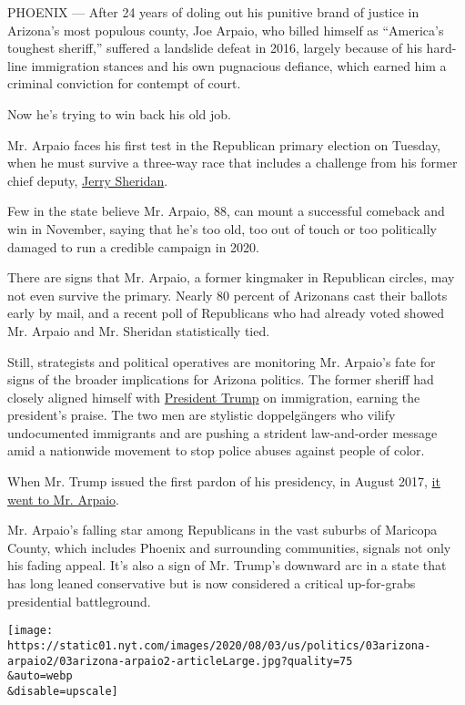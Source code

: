 PHOENIX --- After 24 years of doling out his punitive brand of justice
in Arizona's most populous county, Joe Arpaio, who billed himself as
``America's toughest sheriff,'' suffered a landslide defeat in 2016,
largely because of his hard-line immigration stances and his own
pugnacious defiance, which earned him a criminal conviction for contempt
of court.

Now he's trying to win back his old job.

Mr. Arpaio faces his first test in the Republican primary election on
Tuesday, when he must survive a three-way race that includes a challenge
from his former chief deputy,
\href{https://sheridan4sheriff2020.com/qualifications/}{Jerry Sheridan}.

Few in the state believe Mr. Arpaio, 88, can mount a successful comeback
and win in November, saying that he's too old, too out of touch or too
politically damaged to run a credible campaign in 2020.

There are signs that Mr. Arpaio, a former kingmaker in Republican
circles, may not even survive the primary. Nearly 80 percent of
Arizonans cast their ballots early by mail, and a recent poll of
Republicans who had already voted showed Mr. Arpaio and Mr. Sheridan
statistically tied.

Still, strategists and political operatives are monitoring Mr. Arpaio's
fate for signs of the broader implications for Arizona politics. The
former sheriff had closely aligned himself with
\href{https://www.nytimes.com/interactive/2020/us/elections/donald-trump.html}{President
Trump} on immigration, earning the president's praise. The two men are
stylistic doppelgängers who vilify undocumented immigrants and are
pushing a strident law-and-order message amid a nationwide movement to
stop police abuses against people of color.

When Mr. Trump issued the first pardon of his presidency, in August
2017,
\href{https://www.nytimes.com/2017/08/25/us/politics/joe-arpaio-trump-pardon-sheriff-arizona.html}{it
went to Mr. Arpaio}.

Mr. Arpaio's falling star among Republicans in the vast suburbs of
Maricopa County, which includes Phoenix and surrounding communities,
signals not only his fading appeal. It's also a sign of Mr. Trump's
downward arc in a state that has long leaned conservative but is now
considered a critical up-for-grabs presidential battleground.

\texttt{[image: https://static01.nyt.com/images/2020/08/03/us/politics/03arizona-arpaio2/03arizona-arpaio2-articleLarge.jpg?quality=75\\\&auto=webp\\\&disable=upscale]}

